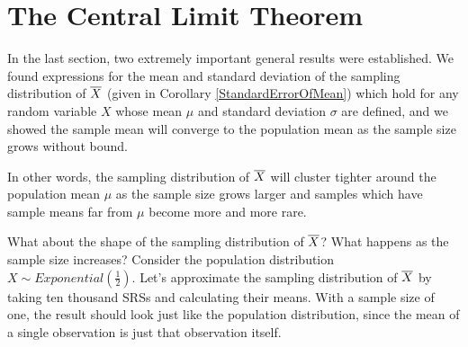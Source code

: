 
\section{The Central Limit Theorem}

In the last section, two extremely important general results were established. We found expressions for the mean and standard deviation of the sampling distribution of ${\overline{X}}$ (given in Corollary \ref{StandardErrorOfMean}) which hold for any random variable $X$ whose mean $\mu$ and standard deviation $\sigma$ are defined, and we showed the sample mean will converge to the population mean as the sample size grows without bound.
\par
In other words, the sampling distribution of ${\overline{X}}$ will cluster tighter around the population mean $\mu$ as the sample size grows larger and samples which have sample means far from $\mu$ become more and more rare. 
\par
What about the shape of the sampling distribution of ${\overline{X}}$? What happens as the sample size increases? Consider the population distribution $X \sim Exponential(\frac{1}{2})$. Let's approximate the sampling distribution of ${\overline{X}}$ by taking ten thousand SRSs and calculating their means. With a sample size of one, the result should look just like the population distribution, since the mean of a single observation is just that observation itself.


